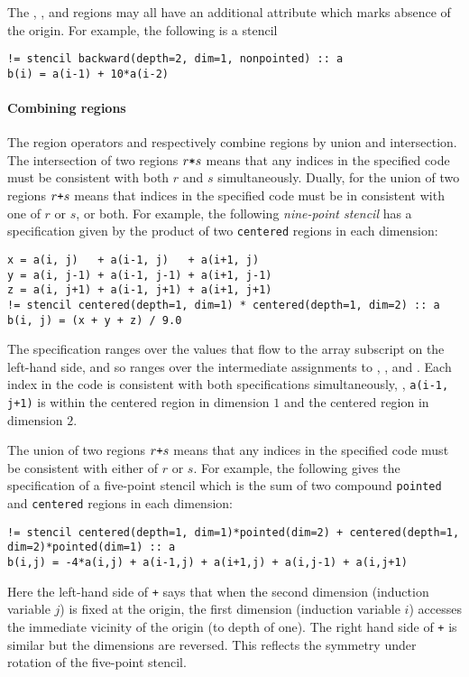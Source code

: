\documentclass[acmlarge,review,anonymous]{acmart}\settopmatter{printfolios=true}
\theoremstyle{definition}
\theoremstyle{plain}
\theoremstyle{remark}
\begin{document}
The , , and  regions may
all have an additional attribute  which marks absence
of the origin.  For example, the following is a
  stencil
%
\begin{verbatim}
!= stencil backward(depth=2, dim=1, nonpointed) :: a
b(i) = a(i-1) + 10*a(i-2)
\end{verbatim}

\paragraph{Combining regions}

The region operators \term{+} and \term{*} respectively combine
regions by union and intersection. The intersection of two regions
$r \texttt{*} s$ means that any indices in the specified code must be
consistent with both $r$ and $s$ simultaneously.
 Dually, for the union of two regions
 $r \texttt{+} s$ means that indices in the specified code must be
 in consistent with one of $r$ or $s$, or both.
For example, the following \emph{nine-point stencil}
has a specification given by the product of two \texttt{centered}
regions in each dimension:
\begin{verbatim}
x = a(i, j)   + a(i-1, j)   + a(i+1, j)
y = a(i, j-1) + a(i-1, j-1) + a(i+1, j-1)
z = a(i, j+1) + a(i-1, j+1) + a(i+1, j+1)
!= stencil centered(depth=1, dim=1) * centered(depth=1, dim=2) :: a
b(i, j) = (x + y + z) / 9.0
\end{verbatim}
%
The specification ranges over the
values that flow to the array subscript on the left-hand side,
and so ranges over the intermediate assignments to ,
, and . Each index in the code is consistent
with both specifications simultaneously, \eg{}, \texttt{a(i-1, j+1)}
is within the centered region in dimension $1$ and the centered region
in dimension $2$.

The union of two regions $r \texttt{+} s$ means that any indices
in the specified code must be consistent with either of $r$ or $s$.
For example, the following gives the specification of a five-point
stencil which is the sum of two compound \texttt{pointed} and
\texttt{centered} regions in each dimension:
%
\begin{verbatim}
!= stencil centered(depth=1, dim=1)*pointed(dim=2) + centered(depth=1, dim=2)*pointed(dim=1) :: a
b(i,j) = -4*a(i,j) + a(i-1,j) + a(i+1,j) + a(i,j-1) + a(i,j+1)
\end{verbatim}
Here the left-hand side of \texttt{+} says that when the second dimension
(induction variable $j$) is fixed at the origin, the first dimension
(induction variable $i$) accesses the immediate vicinity of the origin
(to depth of one). The right hand side of \texttt{+} is similar but the dimensions are reversed.
This reflects the symmetry under rotation of the five-point stencil.
\end{document}
